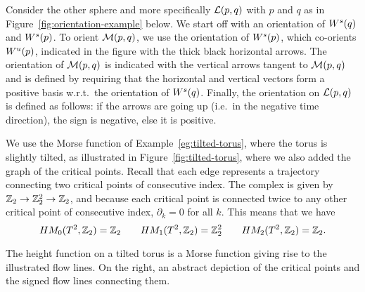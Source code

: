     \begin{eg}
        Consider the other sphere and more specifically $\L pq$ with $p$ and  $q$ as in Figure~\ref{fig:orientation-example} below. 
        We start off with an orientation of $\stable q$ and  $\stable p$.
        To orient  $\traj pq$, we use the orientation of  $\stable p$, which co-orients $\unstable p$, indicated in the figure with the thick black horizontal arrows.
        The orientation of $\traj pq$ is indicated with the vertical arrows tangent to  $\traj pq$ and is defined by requiring that the horizontal and vertical vectors form a positive basis w.r.t.\ the orientation of  $\stable q$.
        Finally, the orientation on $\L pq$ is defined as follows: if the arrows are going up (i.e.\ in the negative time direction), the sign is negative, else it is positive.
        \begin{figure}[H]
    \centering
\end{figure}
    \end{eg}
    \filbreak
\begin{eg}
    We use the Morse function of Example~\ref{eg:tilted-torus}, where the torus is slightly tilted, as illustrated in Figure~\ref{fig:tilted-torus}, where we also added the graph of the critical points.
    Recall that each edge represents a trajectory connecting two critical points of consecutive index.
    The complex is given by $ \Z_2 \to  \Z_2^2 \to \Z_2$, and because each critical point is connected twice to any other critical point of consecutive index, $\partial_k = 0$ for all $k$. 
    This means that we have
    \[
        \HMf[0]{T^2, \Z_2} = \Z_2 \qquad
        \HMf[1]{T^2, \Z_2} = \Z_2^2 \qquad
        \HMf[2]{T^2, \Z_2} = \Z_2
    .\] 
\end{eg}
\begin{marginfigure}
    \centering
    \caption{The height function on a tilted torus is a Morse function giving rise to the illustrated flow lines.
        On the right, an abstract depiction of the critical points and the signed flow lines connecting them.
    }

    \label{fig:tilted-torus}
\end{marginfigure}
